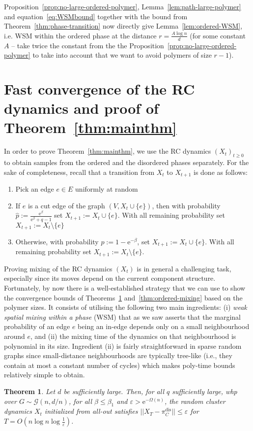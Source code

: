 \documentclass[11pt]{article}
\theoremstyle{plain}
\newtheorem{theorem}{Theorem}
\let\epsilon=\varepsilon
\newcommand{\G}{\mathcal{G}}
\newcommand{\emm}{\mathrm{e}}
\newcommand{\1}{\mathbb{1}}
\newcommand{\dis}{\mathrm{dis}}
\begin{document}
Proposition~\ref{prop:no-large-ordered-polymer}, Lemma~\ref{lem:path-large-polymer} and equation~\eqref{eq:WSMbound} together with the bound from Theorem~\ref{thm:phase-transition} now directly give Lemma~\ref{lem:ordered-WSM}, i.e. WSM within the ordered phase at the distance \(r = \frac{A\log n}{d}\) (for some constant \(A\) -- take twice the constant from the the Proposition~\ref{prop:no-large-ordered-polymer} to take into account that we want to avoid polymers of size \(r - 1\)).

\section{Fast convergence of the RC dynamics and proof of Theorem~\ref{thm:mainthm}}\label{sec:RCdynamics}
In order to prove  Theorem~\ref{thm:mainthm}, we use the  RC dynamics $(X_t)_{t\geq 0}$ to obtain samples from the ordered and the disordered phases separately. For the sake of completeness, recall that a transition from \(X_t\) to \(X_{t+1}\) is done as follows:
\begin{enumerate}[(1)]
    \item Pick an edge \(e\in E\) uniformly at random
    \item If \(e\) is a cut edge of the graph \((V,X_t\cup\{e\})\), then with probability \(\hat p := \frac{\emm^\beta}{\emm^\beta+q-1}\) set \(X_{t+1} := X_t\cup \{e\}\). With all remaining probability set \(X_{t+1} := X_t \setminus \{e\}\)
    \item Otherwise, with probability \(p := 1-\emm^{-\beta}\), set \(X_{t+1} := X_t\cup\{e\}\). With all remaining probability set \(X_{t+1} := X_t \setminus \{e\}\).
\end{enumerate}


Proving mixing of the RC dynamics $(X_t)$ is in general a challenging task, especially since its moves depend on the current component structure. Fortunately, by now there is a well-established strategy \cite{SinclairsGheissari2022, Galanis_Goldberg_Smolarova_2024, galanis2024plantingmcmcsamplingpottsarxiv} that we can use to show the convergence bounds of Theorems~\ref{thm:disordered-mixing} and~\ref{thm:ordered-mixing} based on the polymer sizes. It consists of utilising the following two main ingredients: (i)  \textit{weak spatial mixing within a phase} (WSM) that as we saw asserts that the marginal probability of an edge $e$ being an in-edge depends only on a small neighbourhood around $e$, and (ii) the mixing time of the dynamics on that neighbourhood is polynomial in its size.  Ingredient (ii) is fairly straightforward in sparse random graphs since small-distance neighbourhoods are typically tree-like (i.e., they contain at most a constant number of cycles) which makes poly-time bounds relatively simple to obtain.
\begin{theorem}\label{thm:disordered-mixing}
    Let $d$ be sufficiently large. Then, for all $q$ sufficiently large,  whp over \(G\sim\G(n,d/n)\), for all \(\beta \leq \beta_1\) and \(\epsilon > \emm^{-\Omega(n)}\), the random cluster dynamics \(X_t\) initialized from all-out satisfies \(||X_T - \pi^\dis_C|| \leq \epsilon\) for \(T = O(n\log n\log\tfrac 1\epsilon)\).
\end{theorem}
\end{document}

